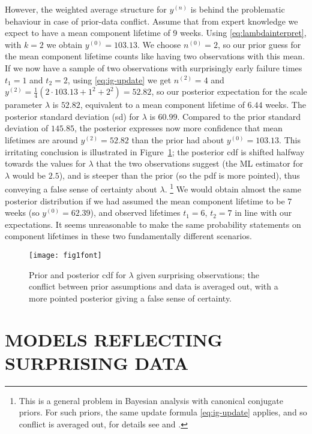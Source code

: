 \documentclass[12pt,a4paper,twocolumn,fleqn]{narms}
\newcommand{\uz}{^{(0)}} %
\newcommand{\un}{^{(n)}} %
\def\yz{y\uz}
\def\yn{y\un}
\newcommand{\yfun}[1]{y^{({#1})}}
\def\nz{n\uz}
\newcommand{\nfun}[1]{n^{({#1})}}
\begin{document}
However, the weighted average structure for $\yn$
is behind the problematic behaviour in case of prior-data conflict.
Assume that from expert knowledge we expect
to have a mean component lifetime of 9 weeks.
Using \eqref{eq:lambdainterpret}, with $k=2$ we obtain $\yz = 103.13$.
We choose $\nz = 2$, so our prior guess for the mean component lifetime
counts like having two observations with this mean.
If we now have a sample of two observations
with surprisingly early failure times $t_1 = 1$ and $t_2 = 2$,
using \eqref{eq:ig-update} we get $\nfun{2} = 4$
and $\yfun{2} = \frac{1}{4}(2 \cdot 103.13 + 1^2 + 2^2) = 52.82$,
so our posterior expectation for the scale parameter $\lambda$ is $52.82$,
equivalent to a mean component lifetime of $6.44$ weeks.
The posterior standard deviation (sd) for $\lambda$ is $60.99$.
Compared to the prior standard deviation of $145.85$,
the posterior expresses now more confidence that mean lifetimes are around $\yfun{2} = 52.82$
than the prior had about $\yz = 103.13$.
This irritating conclusion is illustrated in Figure~\ref{fig:weibull-pdc};
the posterior cdf is shifted halfway towards the values for $\lambda$
that the two observations suggest
(the ML estimator for $\lambda$ would be $2.5$),
and is steeper than the prior (so the pdf is more pointed),
thus conveying a false sense of certainty about $\lambda$.%
\footnote{This is a general problem in Bayesian analysis with canonical conjugate priors.
For such priors, the same update formula \eqref{eq:ig-update} applies,
and so conflict is averaged out, for details see  and .}
We would obtain almost the same %
posterior distribution
if we had assumed the mean component lifetime to be 7 weeks (so $\yz = 62.39$),
and observed lifetimes $t_1 = 6$, $t_2 = 7$ in line with our expectations.
It seems unreasonable to make the same probability statements on component lifetimes in these two fundamentally different scenarios.

\begin{figure}
\texttt{[image: fig1font]}
\caption{Prior and posterior cdf for $\lambda$ given surprising observations;
the conflict between prior assumptions and data is averaged out,
with a more pointed posterior giving a false sense of certainty.}
\label{fig:weibull-pdc}
\end{figure}


\section{MODELS REFLECTING SURPRISING DATA}
\label{sec:modforsurpr}
\end{document}
